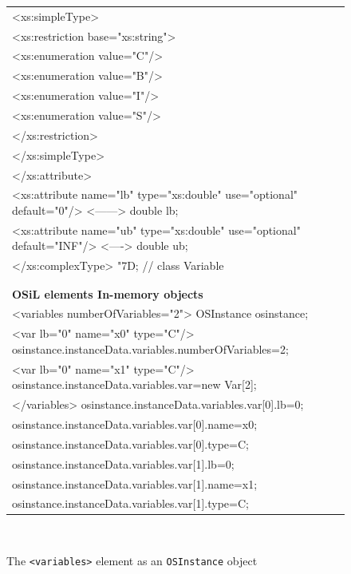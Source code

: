 \documentclass[11pt]{article}
\newcommand{\Sa}{8pt}
\newcommand{\Sb}{0pt}
\renewcommand{\_}{{\char"5F}}
\renewcommand{\{}{{\char"7B}}
\renewcommand{\}}{{\char"7D}}
\renewcommand{\^}{{\char"0D}}
\renewcommand{\'}{{\char"0D}}
\begin{document}
\begin{enumerate}[Step 1:]
\begin{figure}[hb]
{{\begin{tabular}{@{}l@{}}
    <xs:simpleType>\\[\Sb]
      <xs:restriction base="xs:string">\\[\Sb]
        <xs:enumeration value="C"/>\\[\Sb]
        <xs:enumeration value="B"/>\\[\Sb]
        <xs:enumeration value="I"/>\\[\Sb]
        <xs:enumeration value="S"/>\\[\Sb]
      </xs:restriction>\\[\Sb]
    </xs:simpleType>\\[\Sb]
  </xs:attribute>\\[\Sb]
  <xs:attribute name="lb" type="xs:double" use="optional" default="0"/>  <------>    double lb;\\[\Sb]
  <xs:attribute name="ub" type="xs:double" use="optional" default="INF"/>  <---->    double ub;\\[\Sb]
</xs:complexType>                                                                  \}; // class Variable\\[\Sb]
 \\[\Sb]
 \\[\Sb]
\textsf{\textbf{OSiL elements          \hspace{1.97in}  In-memory objects}}\\[\Sa]
<variables numberOfVariables="2">                   OSInstance osinstance;\\[\Sb]
   <var lb="0" name="x0" type="C"/>                 osinstance.instanceData.variables.numberOfVariables=2;\\[\Sb]
   <var lb="0" name="x1" type="C"/>                 osinstance.instanceData.variables.var=new Var[2];\\[\Sb]
</variables>                                        osinstance.instanceData.variables.var[0].lb=0;\\[\Sb]
                                                    osinstance.instanceData.variables.var[0].name=x0;\\[\Sb]
                                                    osinstance.instanceData.variables.var[0].type=C;\\[\Sb]
                                                    osinstance.instanceData.variables.var[1].lb=0;\\[\Sb]
                                                    osinstance.instanceData.variables.var[1].name=x1;\\[\Sb]
                                                    osinstance.instanceData.variables.var[1].type=C;
\end{tabular} }} \medskip\\[\Sb]
\caption{The {\tt <variables>} element as an {\tt OSInstance} object} \label{figure:osinstancevariables}
\end{figure}



\end{enumerate}
\end{document}
